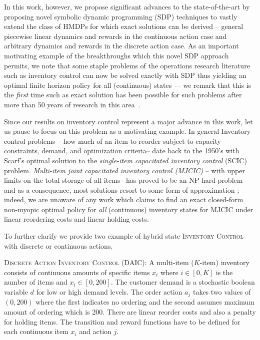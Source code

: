 \documentclass[twoside,11pt]{article}
\newcommand{\InventoryControl}{\textsc{Inventory Control }}
\newtheorem*{example*}{Example}
\begin{document}
In this work, however, we propose significant advances to the
state-of-the-art by proposing novel symbolic dynamic programming (SDP)
techniques to vastly extend the class of HMDPs for which exact
solutions can be derived -- general piecewise linear dynamics and rewards in
the continuous action case and arbitrary dynamics and rewards in the
discrete action case.  As an important motivating example of the
breakthroughs which this novel SDP approach permits, we note that some
staple problems of the operations research literature such as
inventory control can now be solved exactly with SDP thus yielding an
optimal finite horizon policy for all (continuous) states --- we remark
that this is the \emph{first} time such as exact solution has been possible
for such problems after more than 50 years of research in this
area~\cite{Scarf_Karlin58}.

Since our results on inventory control represent a major advance
in this work, let us pause to focus on this problem 
as a motivating example.
In general Inventory control problems -- how much of an item to
reorder subject to capacity constraints, demand, and optimization
criteria-- date back to the 1950's with Scarf's optimal solution to
the \emph{single-item capacitated inventory control} (SCIC) problem.
\emph{Multi-item joint capacitated inventory control (MJCIC)} -- with
upper limits on the total storage of all items-- has proved to be an
NP-hard problem and as a consequence, most solutions resort to some
form of approximation \cite{bitran,wusd10}; indeed, we are unaware of
any work which claims to find an exact closed-form non-myopic optimal
policy for \emph{all} (continuous) inventory states for MJCIC under
linear reordering costs and linear holding costs.

To further clarify we provide two example of hybrid state \InventoryControl with discrete or continuous actions.
\vspace{2mm}

\textsc{Discrete Action} \InventoryControl (\textsc{DAIC}): 
A multi-item ($K$-item) inventory consists of continuous amounts of specific items $x_i$ where $i \in [0,K]$ is the number of items and $x_i \in [0,200]$. The customer demand is a stochastic boolean variable $d$ for low or high demand levels.  The order action $a_j$ takes two values of $(0,200)$ where the first indicates no ordering and the second assumes maximum amount of ordering which is 200. There are linear reorder costs and also a penalty for holding items. The transition and reward functions have to be defined for each continuous item $x_i$ and action $j$.
\end{document}
